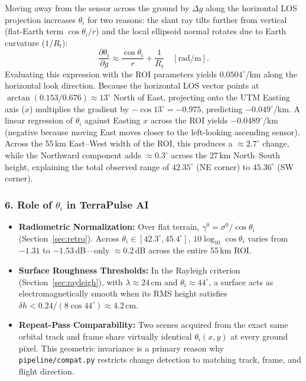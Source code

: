 \documentclass[11pt,a4paper]{article}
\newcommand{\src}[1]{\nolinkurl{#1}}
\begin{document}
Moving away from the sensor across the ground by $\Delta g$ along the horizontal LOS projection increases $\theta_i$ for two reasons: the slant ray tilts further from vertical (flat-Earth term $\cos\theta_i / r$) and the local ellipsoid normal rotates due to Earth curvature ($1/R_t$):
\begin{equation}
  \frac{\partial\theta_i}{\partial g} \approx \frac{\cos\theta_i}{r} + \frac{1}{R_t}\quad[\text{rad/m}].
\end{equation}
Evaluating this expression with the ROI parameters yields $0.0504^\circ$/km along the horizontal look direction. Because the horizontal LOS vector points at $\arctan(0.153/0.676) \approx 13^\circ$ North of East, projecting onto the UTM Easting axis ($x$) multiplies the gradient by $-\cos 13^\circ = -0.975$, predicting $-0.049^\circ$/km. A linear regression of $\theta_i$ against Easting $x$ across the ROI yields $-0.0489^\circ$/km (negative because moving East moves closer to the left-looking ascending sensor). Across the 55\,km East--West width of the ROI, this produces a $\approx 2.7^\circ$ change, while the Northward component adds $\approx 0.3^\circ$ across the 27\,km North--South height, explaining the total observed range of $42.35^\circ$ (NE corner) to $45.36^\circ$ (SW corner).

\subsubsection*{6. Role of $\theta_i$ in TerraPulse AI}

\begin{itemize}
  \item \textbf{Radiometric Normalization:} Over flat terrain, $\gamma^0 = \sigma^0/\cos\theta_i$ (Section~\ref{sec:retro}). Across $\theta_i \in [42.3^\circ, 45.4^\circ]$, $10\log_{10}\cos\theta_i$ varies from $-1.31$ to $-1.53$\,dB---only $\approx 0.2$\,dB across the entire 55\,km ROI.
  \item \textbf{Surface Roughness Thresholds:} In the Rayleigh criterion (Section~\ref{sec:rayleigh}), with $\lambda \approx 24$\,cm and $\theta_i \approx 44^\circ$, a surface acts as electromagnetically smooth when its RMS height satisfies $\delta h < 0.24/(8\cos 44^\circ) \approx 4.2$\,cm.
  \item \textbf{Repeat-Pass Comparability:} Two scenes acquired from the exact same orbital track and frame share virtually identical $\theta_i(x,y)$ at every ground pixel. This geometric invariance is a primary reason why \src{pipeline/compat.py} restricts change detection to matching track, frame, and flight direction.
\end{itemize}
\end{document}
